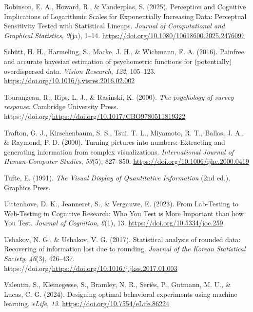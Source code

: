 \documentclass[
  10pt,
  letterpaper,
  DIV=11,
  numbers=noendperiod]{scrartcl}
\newlength{\cslhangindent}
\newenvironment{CSLReferences}[2] %
 {\begin{list}{}{%
  \setlength{\itemindent}{0pt}
  \setlength{\leftmargin}{0pt}
  \setlength{\parsep}{0pt}
  \ifodd #1
   \setlength{\leftmargin}{\cslhangindent}
   \setlength{\itemindent}{-1\cslhangindent}
  \fi
  \setlength{\itemsep}{#2\baselineskip}}}
 {\end{list}}
\begin{document}
\begin{CSLReferences}{1}{0}
Robinson, E. A., Howard, R., \& Vanderplas, S. (2025). Perception and
{Cognitive Implications} of {Logarithmic Scales} for {Exponentially
Increasing Data}: {Perceptual Sensitivity Tested} with {Statistical
Lineups}. \emph{Journal of Computational and Graphical Statistics},
\emph{0}(ja), 1--14. \url{https://doi.org/10.1080/10618600.2025.2476097}

Schütt, H. H., Harmeling, S., Macke, J. H., \& Wichmann, F. A. (2016).
Painfree and accurate bayesian estimation of psychometric functions for
(potentially) overdispersed data. \emph{Vision Research}, \emph{122},
105--123. \url{https://doi.org/10.1016/j.visres.2016.02.002}

Tourangeau, R., Rips, L. J., \& Rasinski, K. (2000). \emph{The
psychology of survey response}. Cambridge University Press.
https://doi.org/\url{https://doi.org/10.1017/CBO9780511819322}

Trafton, G. J., Kirschenbaum, S. S., Tsui, T. L., Miyamoto, R. T.,
Ballas, J. A., \& Raymond, P. D. (2000). Turning pictures into numbers:
Extracting and generating information from complex visualizations.
\emph{International Journal of Human-Computer Studies}, \emph{53}(5),
827--850. \url{https://doi.org/10.1006/ijhc.2000.0419}

Tufte, E. (1991). \emph{The {Visual} {Display} of {Quantitative}
{Information}} (2nd ed.). Graphics Press.

Uittenhove, D. K., Jeanneret, S., \& Vergauwe, E. (2023). From
{Lab-Testing} to {Web-Testing} in {Cognitive Research}: {Who You Test}
is {More Important} than how {You Test}. \emph{Journal of Cognition},
\emph{6}(1), 13. \url{https://doi.org/10.5334/joc.259}

Ushakov, N. G., \& Ushakov, V. G. (2017). Statistical analysis of
rounded data: {Recovering} of information lost due to rounding.
\emph{Journal of the Korean Statistical Society}, \emph{46}(3),
426--437.
https://doi.org/\url{https://doi.org/10.1016/j.jkss.2017.01.003}

Valentin, S., Kleinegesse, S., Bramley, N. R., Seriès, P., Gutmann, M.
U., \& Lucas, C. G. (2024). Designing optimal behavioral experiments
using machine learning. \emph{{eLife}}, \emph{13}.
\url{https://doi.org/10.7554/eLife.86224}


\end{CSLReferences}
\end{document}

